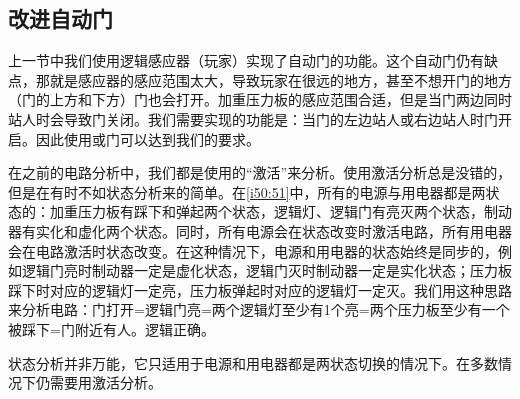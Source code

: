 
\subsection{改进自动门}

上一节中我们使用逻辑感应器（玩家）实现了自动门的功能。这个自动门仍有缺点，那就是感应器的感应范围太大，导致玩家在很远的地方，甚至不想开门的地方（门的上方和下方）门也会打开。加重压力板的感应范围合适，但是当门两边同时站人时会导致门关闭。我们需要实现的功能是：当门的左边站人或右边站人时门开启。因此使用或门可以达到我们的要求。

\begin{figure}[!ht]
\begin{center}
\end{center}
\caption{}
\label{i50:51}
\end{figure}

在之前的电路分析中，我们都是使用的“激活”来分析。使用激活分析总是没错的，但是在有时不如状态分析来的简单。在\autoref{i50:51}中，所有的电源与用电器都是两状态的：加重压力板有踩下和弹起两个状态，逻辑灯、逻辑门有亮灭两个状态，制动器有实化和虚化两个状态。同时，所有电源会在状态改变时激活电路，所有用电器会在电路激活时状态改变。在这种情况下，电源和用电器的状态始终是同步的，例如逻辑门亮时制动器一定是虚化状态，逻辑门灭时制动器一定是实化状态；压力板踩下时对应的逻辑灯一定亮，压力板弹起时对应的逻辑灯一定灭。我们用这种思路来分析电路：门打开=逻辑门亮=两个逻辑灯至少有1个亮=两个压力板至少有一个被踩下=门附近有人。逻辑正确。

状态分析并非万能，它只适用于电源和用电器都是两状态切换的情况下。在多数情况下仍需要用激活分析。

